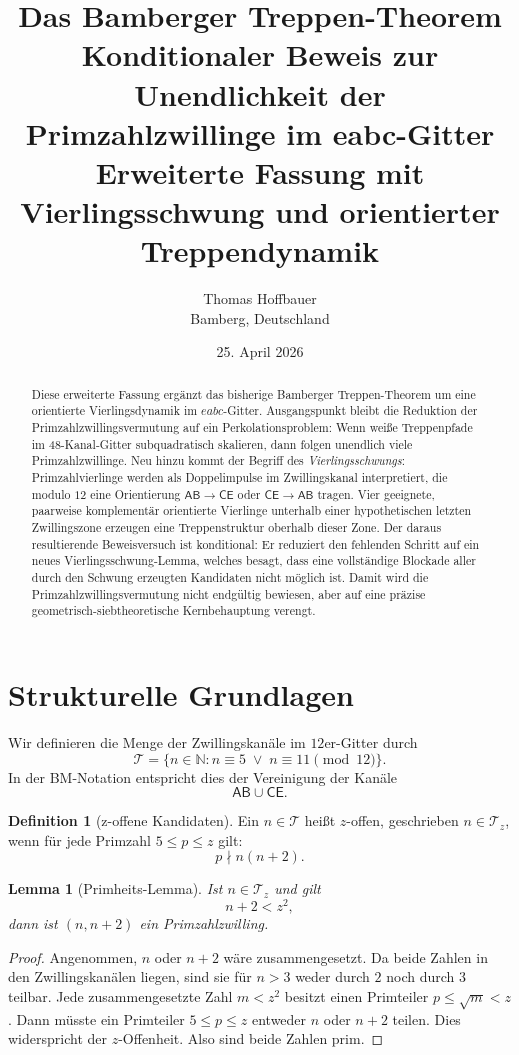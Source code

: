 \documentclass[11pt,a4paper]{article}
\title{Das Bamberger Treppen-Theorem\\
\large Konditionaler Beweis zur Unendlichkeit der Primzahlzwillinge im eabc-Gitter\\
\large Erweiterte Fassung mit Vierlingsschwung und orientierter Treppendynamik}
\author{Thomas Hoffbauer\\Bamberg, Deutschland}
\date{25. April 2026}
\newtheorem{lemma}{Lemma}
\theoremstyle{definition}
\newtheorem{definition}{Definition}
\newcommand{\N}{\mathbb{N}}
\newcommand{\T}{\mathcal{T}}
\newcommand{\CE}{\mathsf{CE}}
\newcommand{\AB}{\mathsf{AB}}
\begin{document}
\maketitle

\begin{abstract}
Diese erweiterte Fassung ergänzt das bisherige Bamberger Treppen-Theorem um eine orientierte Vierlingsdynamik im $eabc$-Gitter. Ausgangspunkt bleibt die Reduktion der Primzahlzwillingsvermutung auf ein Perkolationsproblem: Wenn weiße Treppenpfade im 48-Kanal-Gitter subquadratisch skalieren, dann folgen unendlich viele Primzahlzwillinge. Neu hinzu kommt der Begriff des \emph{Vierlingsschwungs}: Primzahlvierlinge werden als Doppelimpulse im Zwillingskanal interpretiert, die modulo $12$ eine Orientierung $\AB\to\CE$ oder $\CE\to\AB$ tragen. Vier geeignete, paarweise komplementär orientierte Vierlinge unterhalb einer hypothetischen letzten Zwillingszone erzeugen eine Treppenstruktur oberhalb dieser Zone. Der daraus resultierende Beweisversuch ist konditional: Er reduziert den fehlenden Schritt auf ein neues Vierlingsschwung-Lemma, welches besagt, dass eine vollständige Blockade aller durch den Schwung erzeugten Kandidaten nicht möglich ist. Damit wird die Primzahlzwillingsvermutung nicht endgültig bewiesen, aber auf eine präzise geometrisch-siebtheoretische Kernbehauptung verengt.
\end{abstract}

\tableofcontents

\section{Strukturelle Grundlagen}

Wir definieren die Menge der Zwillingskanäle im $12$er-Gitter durch
\[
\T=\{n\in\N: n\equiv 5 \;\vee\; n\equiv 11 \pmod {12}\}.
\]
In der BM-Notation entspricht dies der Vereinigung der Kanäle
\[
\AB\cup\CE.
\]

\begin{definition}[z-offene Kandidaten]
Ein $n\in\T$ heißt $z$-offen, geschrieben $n\in\T_z$, wenn für jede Primzahl $5\leq p\leq z$ gilt:
\[
p\nmid n(n+2).
\]
\end{definition}

\begin{lemma}[Primheits-Lemma]
Ist $n\in\T_z$ und gilt
\[
n+2<z^2,
\]
dann ist $(n,n+2)$ ein Primzahlzwilling.
\end{lemma}

\begin{proof}
Angenommen, $n$ oder $n+2$ wäre zusammengesetzt. Da beide Zahlen in den Zwillingskanälen liegen, sind sie für $n>3$ weder durch $2$ noch durch $3$ teilbar. Jede zusammengesetzte Zahl $m<z^2$ besitzt einen Primteiler $p\leq \sqrt m<z$. Dann müsste ein Primteiler $5\leq p\leq z$ entweder $n$ oder $n+2$ teilen. Dies widerspricht der $z$-Offenheit. Also sind beide Zahlen prim.
\end{proof}
\end{document}
